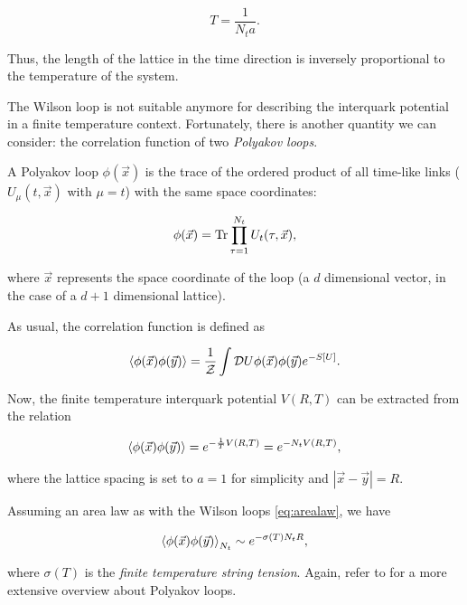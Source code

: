 \documentclass[reqno,12pt]{article}
\numberwithin{equation}{section}
\begin{document}
\begin{equation} \label{eq:lattice_temperature}
	T = \frac{1}{N_t a}.
\end{equation}

Thus, the length of the lattice in the time direction is inversely proportional to the temperature of the system.

The Wilson loop is not suitable anymore for describing the interquark potential in a finite temperature context. Fortunately,
there is another quantity we can consider: the correlation function of two \textit{Polyakov loops}. 

A Polyakov loop $\phi(\vec{x})$ is the trace of the ordered product of all time-like links ($U_\mu(t, \vec{x})$ with $\mu = t$) 
with the same space coordinates:

\begin{equation} \label{eq:polyloop_def}
	\phi(\vec{x}) = \Tr \prod_{\tau = 1}^{N_t} U_t(\tau, \vec{x}),
\end{equation}

where $\vec{x}$ represents the space coordinate of the loop (a $d$ dimensional vector, in the case of a $d+1$ dimensional lattice).

As usual, the correlation function is defined as

\begin{equation}
	\expval{\phi(\vec{x}) \phi(\vec{y})} = \frac{1}{\mathcal{Z}} \int \mathcal{D}U \phi(\vec{x}) \phi(\vec{y}) e^{-S[U]}.
\end{equation}

Now, the finite temperature interquark potential $V(R, T)$ can be extracted from the relation

\begin{equation}
	\expval{\phi(\vec{x}) \phi(\vec{y})} = e^{-\frac{1}{T} V(R, T)} = e^{-N_t V(R, T)},
\end{equation}

where the lattice spacing is set to $a = 1$ for simplicity and $|\vec{x} - \vec{y}| = R$.

Assuming an area law as with the Wilson loops \eqref{eq:arealaw}, we have

\begin{equation} \label{eq:corr_fun_polyloops}
	\expval{\phi(\vec{x}) \phi(\vec{y})}_{N_t} \sim e^{-\sigma(T) N_t R},
\end{equation}

where $\sigma(T)$ is the \textit{finite temperature string tension}. Again, refer to \cite{gattringer} for a more
extensive overview about Polyakov loops.
\end{document}
